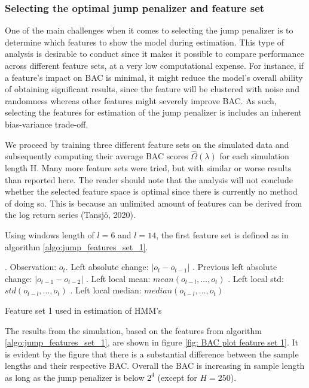 \subsubsection{Selecting the optimal jump penalizer and feature set}
\label{subsubsection: optimal jump penalizer}
One of the main challenges when it comes to selecting the jump penalizer is to determine which features to show the model during estimation. This type of analysis is desirable to conduct since it makes it possible to compare performance across different feature sets, at a very low computational expense. For instance, if a feature's impact on BAC is minimal, it might reduce the model's overall ability of obtaining significant results, since the feature will be clustered with noise and randomness whereas other features might severely improve BAC. As such, selecting the features for estimation of the jump penalizer is includes an inherent bias-variance trade-off.  

We proceed by training three different feature sets on the simulated data and subsequently computing their average BAC scores $\hat\Omega(\lambda)$ for each simulation length H. Many more feature sets were tried, but with similar or worse results than reported here. The reader should note that the analysis will not conclude whether the selected feature space is optimal since there is currently no method of doing so. This is because an unlimited amount of features can be derived from the log return series (Tansjö, 2020). 

Using windows length of $l = 6$ and $l = 14$, the first feature set is defined as in algorithm \ref{algo:jump_features_set_1}. 

\begin{algorithm}[H]
. Observation: $o_t$. Left absolute change: $|o_t-o_{t-1}|$ . Previous left absolute change: $|o_{t-1}-o_{t-2}|$ . Left local mean: $mean(o_{t-l},\ldots,o_{t})$ . Left local std: $std(o_{t-l},\ldots, o_{t})$ . Left local median: $median(o_{t-l},\ldots,o_{t})$ \;
\BlankLine

\caption{Feature set 1 used in \jump estimation of HMM's}
\label{algo:jump_features_set_1}
\end{algorithm}

The results from the simulation, based on the features from algorithm \ref{algo:jump_features_set_1}, are shown in figure \ref{fig: BAC plot feature set 1}. It is evident by the figure that there is a substantial difference between the sample lengths and their respective BAC. Overall the BAC is increasing in sample length as long as the jump penalizer is below $2^4$ (except for $H=250$).

